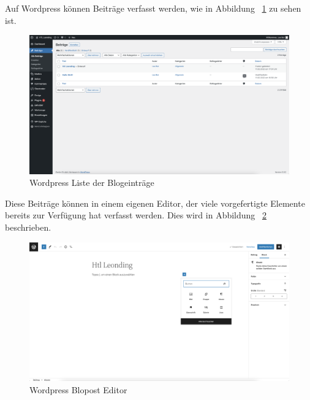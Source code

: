 Auf Wordpress können Beiträge verfasst werden, wie in Abbildung ~\ref{fig:impl:bloglist} zu sehen ist.

\begin{figure}[hbt!]
    \centering
    \includegraphics[scale=0.2]{pics/bloglist}
    \caption{Wordpress Liste der Blogeinträge}
    \label{fig:impl:bloglist}
\end{figure}


Diese Beiträge können in einem eigenen Editor, der viele vorgefertigte Elemente bereits zur Verfügung hat verfasst werden.
Dies wird in Abbildung ~\ref{fig:impl:blogpost} beschrieben.

\begin{figure}[hbt!]
    \centering
    \includegraphics[scale=0.2]{pics/blogpost}
    \caption{Wordpress Blopost Editor}
    \label{fig:impl:blogpost}
\end{figure}
